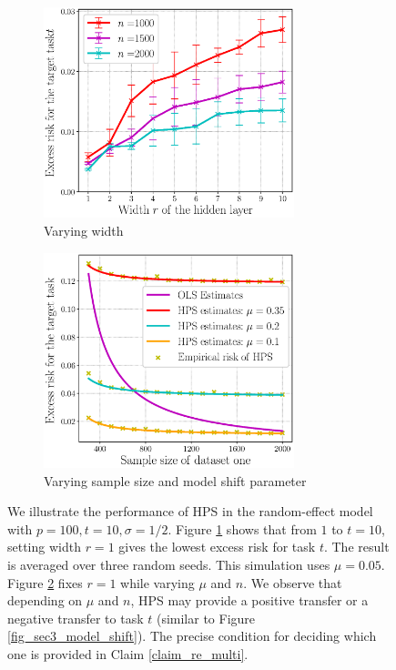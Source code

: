 \begin{figure}[!t]
	\begin{subfigure}[b]{0.5\textwidth}
		\centering
		\includegraphics[width=0.8\textwidth]{figures/multitask_width.eps}
		\caption{Varying width}
		\label{fig_sec4_width}
	\end{subfigure}
	\begin{subfigure}[b]{0.5\textwidth}
		\centering
		\includegraphics[width=0.8\textwidth]{figures/multitask_b.eps}
		\caption{Varying sample size and model shift parameter}
		\label{fig_sec4_transfer}
	\end{subfigure}
	\caption{We illustrate the performance of HPS in the random-effect model with $p = 100, t = 10, \sigma = 1/2$.
	Figure \ref{fig_sec4_width} shows that from $1$ to $t = 10$, setting width $r = 1$ gives the lowest excess risk for task $t$.
	The result is averaged over three random seeds.
	This simulation uses $\mu = 0.05$.
	Figure \ref{fig_sec4_transfer} fixes $r = 1$ while varying $\mu$ and $n$. We observe that depending on $\mu$ and $n$, HPS may provide a positive transfer or a negative transfer to task $t$ (similar to Figure \ref{fig_sec3_model_shift}). The precise condition for deciding which one is provided in Claim \ref{claim_re_multi}.}
	\label{fig_sec4}
\end{figure}


